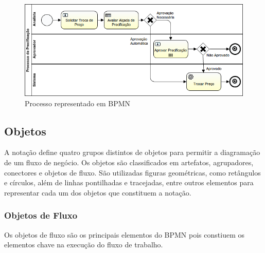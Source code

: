 \begin{figure}[H]
  \centering
  \includegraphics[width=1.0\textwidth]{imagens/ProcessoDePrecificacao.png}
  \caption{Processo representado em BPMN}
  \label{fig:exemplo_bpmn}
\end{figure}

\subsection{Objetos}\label{sec:automatizacao_processos-bpmn_objetos}

A notação define quatro grupos distintos de objetos para permitir a diagramação de um fluxo de negócio. Os objetos são classificados em artefatos, agrupadores, conectores e objetos de fluxo. São utilizadas figuras geométricas, como retângulos e círculos, além de linhas pontilhadas e tracejadas, entre outros elementos para representar cada um dos objetos que constituem a notação.

\subsubsection{Objetos de Fluxo}\label{sec:automatizacao_processos-bpmn_objetos_fluxo}

Os objetos de fluxo são os principais elementos do BPMN pois constiuem os elementos chave na execução do fluxo de trabalho.


